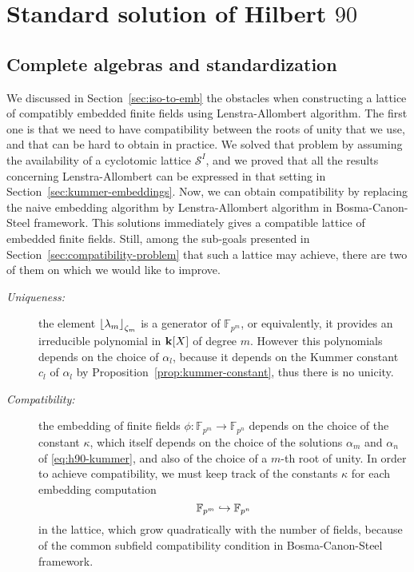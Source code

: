 \section{Standard solution of Hilbert $90$}
\label{sec:standard-solution}

\subsection{Complete algebras and standardization}
\label{sec:standardization}

We discussed in Section~\ref{sec:iso-to-emb} the 
obstacles when constructing a lattice of compatibly embedded finite fields using
Lenstra-Allombert algorithm. The first one is that we need to have compatibility
between the roots of unity that we use, and that can be hard to obtain in
practice. We solved that problem by assuming the availability of a
cyclotomic lattice $\mathcal S^I$, and we proved that all the results concerning
Lenstra-Allombert can be expressed in that setting in
Section~\ref{sec:kummer-embeddings}. Now, we can obtain compatibility by
replacing the naive embedding algorithm by Lenstra-Allombert algorithm in
Bosma-Canon-Steel framework. This solutions immediately gives a compatible
lattice of embedded finite fields. Still, among the sub-goals presented in
Section~\ref{sec:compatibility-problem} that such a lattice may achieve, there
are two of them on which we would like to improve.
\begin{description}
  \item[\emph{Uniqueness:}] the element $\left\lfloor \lambda_m \right\rfloor_{\zeta_m}$ is
    a generator of $\mathbb{F}_{p^{m}}$, or equivalently, it provides an
    irreducible polynomial in $\mathbf{k}[X]$ of degree $m$. However this polynomials
    depends on the choice of $\alpha_l$, because it depends on the Kummer constant
    $c_l$ of $\alpha_l$ by Proposition~\ref{prop:kummer-constant}, thus there is
    no unicity.
  \item[\emph{Compatibility:}] the embedding of finite fields
    $\phi:\mathbb{F}_{p^{m}}\to\mathbb{F}_{p^{n}}$ depends on
    the choice of the constant $\kappa$, which itself depends on the choice of
    the solutions $\alpha_m$ and $\alpha_n$ of \eqref{eq:h90-kummer}, and also
    of the choice of a $m$-th root of unity. In order to achieve compatibility,
    we must keep track of the constants $\kappa$ for each embedding computation
    \[
      \mathbb{F}_{p^{m}}\hookrightarrow\mathbb{F}_{p^{n}}
    \]
    in the
    lattice, which grow quadratically with the number of fields, because of the
    common subfield compatibility condition in Bosma-Canon-Steel framework.
\end{description}
